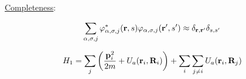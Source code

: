 \noindent \uline{Completeness}:

\begin{align*}
\sum_{\alpha, \sigma, j} \varphi^*_{\alpha, \sigma,j}(\vb{r},s)\varphi_{\alpha, \sigma,j}(\vb{r}',s') \approx \delta_{\vb{r},\vb{r}'} \delta_{s,s'} 
\end{align*}

\begin{align*}
	H_1 = \sum_j \left( \frac{\vb{p}_i^2}{2m}+ U_a (\vb{r}_i, \vb{R}_i) \right) + \sum_i \sum_{j \neq i} U_a ( \vb{r}_i, \vb{R}_j)
\end{align*}